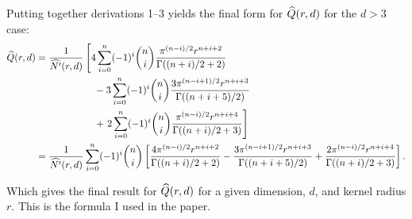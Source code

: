 Putting together derivations 1--3
yields the final form for $\widehat{Q}(r,d)$ for the $d>3$ case:
\begin{align*}
  \widehat{Q}(r,d) &= \frac{1}{\widehat{N'}(r, d)} \left[
        4 \sum_{i=0}^{n} (-1)^i {n \choose i} 
                           \frac{\pi^{(n-i)/2} r^{n+i+2}}{\Gamma((n+i)/2 + 2)} \right. \\
        & \qquad\qquad\qquad
        - 3 \sum_{i=0}^{n} (-1)^i {n \choose i}
                         \frac{3\pi^{(n-i+1)/2} r^{n+i+3}}
                              {\Gamma((n+i+5)/2)} \\
        & \qquad\qquad\qquad
        + \left. 2 \sum_{i=0}^{n}(-1)^i {n \choose i}
                          \frac{\pi^{(n-i)/2} r^{n+i+4}}
                               {\Gamma((n+i)/2+3)} \right] \\
       &= \frac{1}{\widehat{N'}(r, d)} 
        \sum_{i=0}^{n} (-1)^i {n \choose i} \left[
            \frac{4\pi^{(n-i)/2} r^{n+i+2}}{\Gamma((n+i)/2 + 2)}
          - \frac{3\pi^{(n-i+1)/2} r^{n+i+3}}{\Gamma((n+i+5)/2)}
          + \frac{2\pi^{(n-i)/2} r^{n+i+4}}{\Gamma((n+i)/2+3)} 
        \right]
        \text{.}
\end{align*}

Which gives the final result for $\widehat{Q}(r,d)$ for a given dimension, $d$,
and kernel radius $r$.  This is the formula I used in the paper.

